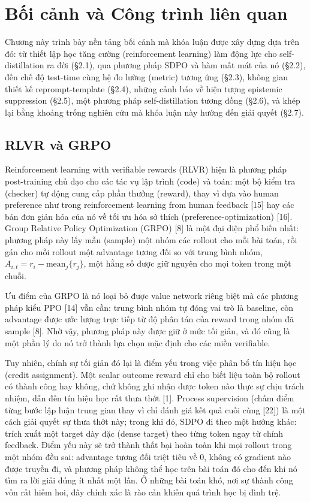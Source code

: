 \chapter{Bối cảnh và Công trình liên quan}\label{chapter-2-background-and-related-work}

Chương này trình bày nền tảng bối cảnh mà khóa luận được xây dựng dựa trên đó: từ thiết lập học tăng cường (reinforcement learning) làm động lực cho self-distillation ra đời (§2.1), qua phương pháp SDPO và hàm mất mát của nó (§2.2), đến chế độ test-time cùng hệ đo lường (metric) tương ứng (§2.3), không gian thiết kế reprompt-template (§2.4), những cảnh báo về hiện tượng epistemic suppression (§2.5), một phương pháp self-distillation tương đồng (§2.6), và khép lại bằng khoảng trống nghiên cứu mà khóa luận này hướng đến giải quyết (§2.7).

\section{RLVR và GRPO}\label{rlvr-and-grpo}

Reinforcement learning with verifiable rewards (RLVR) hiện là phương pháp post-training chủ đạo cho các tác vụ lập trình (code) và toán: một bộ kiểm tra (checker) tự động cung cấp phần thưởng (reward), thay vì dựa vào human preference như trong reinforcement learning from human feedback {[}15{]} hay các bản đơn giản hóa của nó về tối ưu hóa sở thích (preference-optimization) {[}16{]}. Group Relative Policy Optimization (GRPO) {[}8{]} là một đại diện phổ biến nhất: phương pháp này lấy mẫu (sample) một nhóm các rollout cho mỗi bài toán, rồi gán cho mỗi rollout một advantage tương đối so với trung bình nhóm, \(A_{i,t} = r_i - \text{mean}_j\{r_j\}\), một hằng số được giữ nguyên cho mọi token trong một chuỗi.

Ưu điểm của GRPO là nó loại bỏ được value network riêng biệt mà các phương pháp kiểu PPO {[}14{]} vẫn cần: trung bình nhóm tự đóng vai trò là baseline, còn advantage được ước lượng trực tiếp từ độ phân tán của reward trong nhóm đã sample {[}8{]}. Nhờ vậy, phương pháp này được giữ ở mức tối giản, và đó cũng là một phần lý do nó trở thành lựa chọn mặc định cho các miền verifiable.

Tuy nhiên, chính sự tối giản đó lại là điểm yếu trong việc phân bổ tín hiệu học (credit assignment). Một scalar outcome reward chỉ cho biết liệu toàn bộ rollout có thành công hay không, chứ không ghi nhận được token nào thực sự chịu trách nhiệm, dẫn đến tín hiệu học rất thưa thớt {[}1{]}. Process supervision (chấm điểm từng bước lập luận trung gian thay vì chỉ đánh giá kết quả cuối cùng {[}22{]}) là một cách giải quyết sự thưa thớt này; trong khi đó, SDPO đi theo một hướng khác: trích xuất một target dày đặc (dense target) theo từng token ngay từ chính feedback. Điểm yếu này sẽ trở thành thất bại hoàn toàn khi mọi rollout trong một nhóm đều sai: advantage tương đối triệt tiêu về 0, không có gradient nào được truyền đi, và phương pháp không thể học trên bài toán đó cho đến khi nó tìm ra lời giải đúng ít nhất một lần. Ở những bài toán khó, nơi sự thành công vốn rất hiếm hoi, đây chính xác là rào cản khiến quá trình học bị đình trệ.

